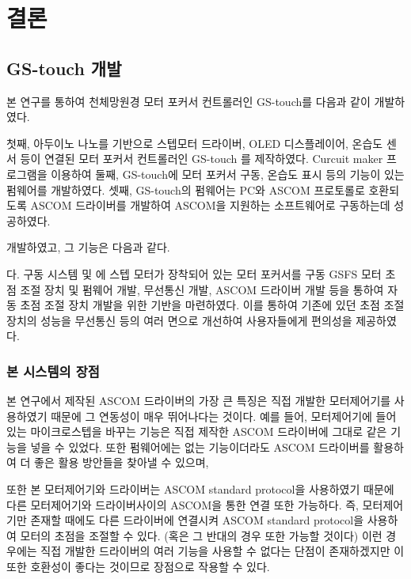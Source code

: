 \section{결론}
	
\subsection{GS-touch 개발}

본 연구를 통하여 천체망원경 모터 포커서 컨트롤러인 GS-touch를 다음과 같이 개발하였다. 

첫째, 아두이노 나노를 기반으로 스텝모터 드라이버, OLED 디스플레이어, 온습도 센서 등이 연결된 모터 포커서 컨트롤러인 GS-touch 를 제작하였다. Curcuit maker 프로그램을 이용하여 
둘째, GS-touch에 모터 포커서 구동, 온습도 표시 등의 기능이 있는 펌웨어를 개발하였다.
셋째, GS-touch의 펌웨어는 PC와 ASCOM 프로토롤로 호환되도록 ASCOM 드라이버를 개발하여 ASCOM을 지원하는 소프트웨어로 구동하는데 성공하였다.

개발하였고, 그 기능은 다음과 같다.

다. 
구동 시스템 및 에 스텝 모터가 장착되어 있는 모터 포커서를 구동 GSFS 모터 초점 조절 장치 및 펌웨어 개발, 무선통신 개발, ASCOM 드라이버 개발 등을 통하여 자동 초점 조절 장치 개발을 위한 기반을 마련하였다. 이를 통하여 기존에 있던 초점 조절 장치의 성능을 무선통신 등의 여러 면으로 개선하여 사용자들에게 편의성을 제공하였다. 


\subsubsection{본 시스템의 장점}
본 연구에서 제작된 ASCOM 드라이버의 가장 큰 특징은 직접 개발한 모터제어기를 사용하였기 때문에 그 연동성이 매우 뛰어나다는 것이다. 예를 들어, 모터제어기에 들어있는 마이크로스텝을 바꾸는 기능은 직접 제작한 ASCOM 드라이버에 그대로 같은 기능을 넣을 수 있었다. 또한 펌웨어에는 없는 기능이더라도 ASCOM 드라이버를 활용하여 더 좋은 활용 방안들을 찾아낼 수 있으며, 

또한 본 모터제어기와 드라이버는 ASCOM standard protocol을 사용하였기 때문에 다른 모터제어기와 드라이버사이의 ASCOM을 통한 연결 또한 가능하다. 즉, 모터제어기만 존재할 때에도 다른 드라이버에 연결시켜 ASCOM standard protocol을 사용하여 모터의 초점을 조절할 수 있다. (혹은 그 반대의 경우 또한 가능할 것이다) 이런 경우에는 직접 개발한 드라이버의 여러 기능을 사용할 수 없다는 단점이 존재하겠지만 이 또한 호환성이 좋다는 것이므로 장점으로 작용할 수 있다.

